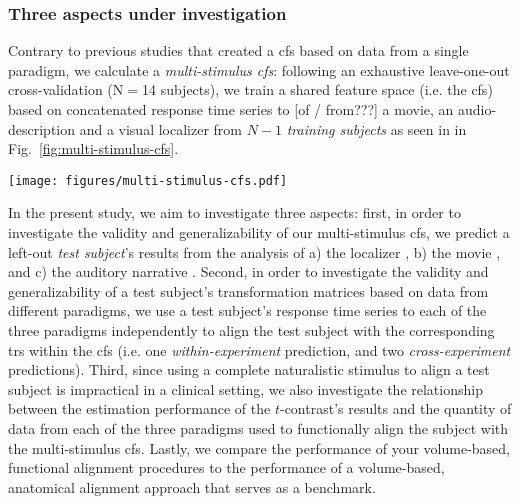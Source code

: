 \subsubsection{Three aspects under investigation}
Contrary to previous studies \citep[e.g.][]{jiahui2020predicting,
guntupalli2016model, haxby2011common} that created a \ac{cfs} based on data from
a single paradigm, we calculate a \textit{multi-stimulus \ac{cfs}}:
following an exhaustive leave-one-out cross-validation (N$=$14 subjects), we
train a shared feature space (i.e. the \ac{cfs}) based on concatenated response
time series to [of / from???] a movie, an audio-description and a visual
localizer from $N-1$ \textit{training subjects} as seen in in
Fig.~\ref{fig:multi-stimulus-cfs}.



\begin{figure*}[tbp]
\centering
    \texttt{[image: figures/multi-stimulus-cfs.pdf]}
    \caption{
    \textbf{Overview of the shared response model.
    }
    The \ac{srm} algorithm uses each $n^{th}$ training subject's
    concatenated response time series to three different paradigms
    represented as matrix $X_{n}$ ({$v$} voxels by $t$ time points)
    to calculate the common functional space (CFS) $C$
    ($k$ shared features by $t$ time points)
    and subject-specific, transformation matrices $W_{n}$ ($v$ voxels by $k$
    shared features) with orthonormal columns ($W_{n}^{T}W_{n}=I_{k}$).
    }
    \label{fig:multi-stimulus-cfs}
\end{figure*}



In the present study, we aim to investigate three aspects:
first, in order to investigate the validity and generalizability of our
multi-stimulus \ac{cfs}, we predict a left-out \textit{test subject}'s results
from the analysis of
%
a) the localizer \citep{sengupta2016extension},
%
b) the movie \citep{haeusler2022processing}, and
%
c) the auditory narrative \citep{haeusler2022processing}.
Second, in order to investigate the validity and generalizability of a test
subject's transformation matrices based on data from different paradigms, we use
a test subject's response time series to each of the three paradigms
independently to align the test subject with the corresponding \acp{tr} within
the \ac{cfs} (i.e. one \textit{within-experiment} prediction, and two
\textit{cross-experiment} predictions).
Third, since using a complete naturalistic stimulus to align a test subject is
impractical in a clinical setting, we also investigate the relationship between
the estimation performance of the $t$-contrast's results and the quantity of
data from each of the three paradigms used to functionally align the subject
with the multi-stimulus \ac{cfs}.
Lastly, we compare the performance of your volume-based, functional alignment
procedures to the performance of a volume-based, anatomical alignment approach
that serves as a benchmark.




